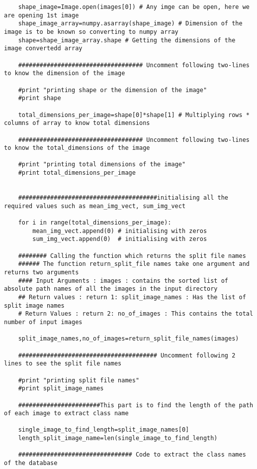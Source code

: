 \documentclass[10pt,a4paper]{article}
\begin{document}
\begin{lstlisting}
	shape_image=Image.open(images[0]) # Any imge can be open, here we are opening 1st image
	shape_image_array=numpy.asarray(shape_image) # Dimension of the image is to be known so converting to numpy array
	shape=shape_image_array.shape # Getting the dimensions of the image convertedd array 

	################################### Uncomment following two-lines to know the dimension of the image 

	#print "printing shape or the dimension of the image"
	#print shape 
	
	total_dimensions_per_image=shape[0]*shape[1] # Multiplying rows * columns of array to know total dimensions
	
	################################### Uncomment following two-lines to know the total_dimensions of the image 

	#print "printing total dimensions of the image"
	#print total_dimensions_per_image 
	

	#######################################initialising all the required values such as mean_img_vect, sum_img_vect

	for i in range(total_dimensions_per_image):
		mean_img_vect.append(0) # initialising with zeros 
		sum_img_vect.append(0)  # initialising with zeros 

	######## Calling the function which returns the split file names 
	###### The function return_split_file names take one argument and returns two arguments
	#### Input Arguments : images : contains the sorted list of absolute path names of all the images in the input directory
	## Return values : return 1: split_image_names : Has the list of split image names
	# Return Values : return 2: no_of_images : This contains the total number of input images

	split_image_names,no_of_images=return_split_file_names(images) 

	####################################### Uncomment following 2 lines to see the split file names 

	#print "printing split file names"
	#print split_image_names

	#######################This part is to find the length of the path of each image to extract class name 
	
	single_image_to_find_length=split_image_names[0]
	length_split_image_name=len(single_image_to_find_length)

	################################ Code to extract the class names of the database


\end{lstlisting}
\end{document}
